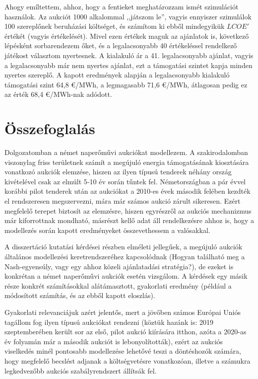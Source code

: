 \documentclass[twoside, magyar, showtrims]{corvinusphd}
\begin{document}
Ahogy emíltettem, ahhoz, hogy a fentieket meghatározzam ismét szimulációt használok.
Az aukciót 1000 alkalommal ,,játszom le'', vagyis ennyiszer
szimulálok 100 szereplőnek beruházási költséget, és számítom ki ebből
mindegyikük $LCOE'$ értékét (vagyis értékelését).
Mivel ezen értékek
maguk az ajánlatok is, következő lépésként sorbarendezem őket,
és a legalacsonyabb 40 értékeléssel rendelkező játékost választom nyertesnek.
A kialakuló ár a 41. legalacsonyabb ajánlat, vagyis a legalacsonyabb 
már nem nyertes ajánlat, ezt a támogatási szintet kapja minden nyertes szereplő.
A kapott eredmények alapján a legalacsonyabb kialakuló 
támogatási szint 64,8 €/MWh, a legmagasabb 71,6 €/MWh,
átlagosan pedig ez az érték 68,4 €/MWh-nak adódott.

\chapter{Összefoglalás}

\scwords Dolgozatomban a német naperőművi aukciókat modellezem.
A szakirodalomban viszonylag friss területnek számít
a megújuló energia támogatásának kiosztására
vonatkozó aukciók elemzése, hiszen az ilyen típusú
tenderek néhány ország kivételével csak az elmúlt 5-10
év során tűntek fel. Németországban a pár évvel korábbi
pilot tenderek után az aukciókat a 2010-es évek második felében
kezdték el rendszeresen megszervezni, mára már számos
aukció zárult sikeresen. Ezért megfelelő terepet biztosít
az elemzésre, hiszen egyrészről az aukciós mechanizmus
már kiforrottnak mondható, másrészt kellő adat
áll rendelkezésre ahhoz is, hogy a modellezés során
kapott eredményeket összevethessem a valósakkal.

A disszertáció kutatási kérdései részben elméleti jellegűek,
a megújuló aukciók általános modellezési keretrendszeréhez
kapcsolódnak (Hogyan található meg a Nash-egyensúly,
vagy egy ahhoz közeli ajánlatadási stratégia?),
de ezeket is konkrétan a német naperőművi
aukciók esetén vizsgálom. A kérdések egy másik része
konkrét számításokkal alátámasztott, gyakorlati eredmény
(például a módosított  számítás, és az ebből
kapott eloszlás).
 
Gyakorlati relevanciájuk
azért jelentős, mert a jövőben számos Európai Uniós
tagállom fog ilyen típusú aukciókat rendezni
(köztük hazánk is: 2019 szeptemberében került
sor az első, pilot aukció kiírására itthon, azóta a 2020-as
év folyamán már a második aukciót is lebonyolították), ezért
az aukciós viselkedés minél pontosabb modellezése
lehetővé teszi a döntéshozók számára, hogy megfelelő
becslést adjanak a költségvetésre vonatkozóan, 
illetve a számukra legkedvezőbb aukciós szabályrendszert állítsák fel.
\end{document}
